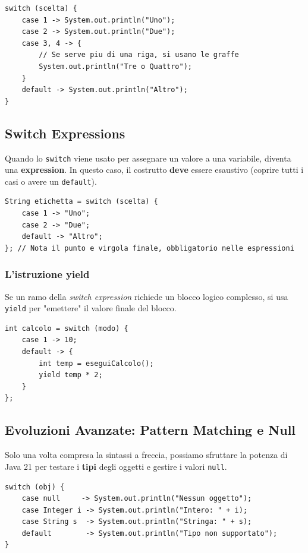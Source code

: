 \begin{lstlisting}[caption={Switch moderno con freccia}]
switch (scelta) {
    case 1 -> System.out.println("Uno");
    case 2 -> System.out.println("Due");
    case 3, 4 -> {
        // Se serve piu di una riga, si usano le graffe
        System.out.println("Tre o Quattro");
    }
    default -> System.out.println("Altro");
}
\end{lstlisting}



\subsection{Switch Expressions}
Quando lo \texttt{switch} viene usato per assegnare un valore a una variabile, diventa una \textbf{expression}. In questo caso, il costrutto \textbf{deve} essere esaustivo (coprire tutti i casi o avere un \texttt{default}).

\begin{lstlisting}[caption={Switch come espressione}]
String etichetta = switch (scelta) {
    case 1 -> "Uno";
    case 2 -> "Due";
    default -> "Altro";
}; // Nota il punto e virgola finale, obbligatorio nelle espressioni
\end{lstlisting}

\subsubsection{L'istruzione yield}
Se un ramo della \textit{switch expression} richiede un blocco logico complesso, si usa \texttt{yield} per "emettere" il valore finale del blocco.

\begin{lstlisting}[caption={Uso di yield}]
int calcolo = switch (modo) {
    case 1 -> 10;
    default -> {
        int temp = eseguiCalcolo();
        yield temp * 2;
    }
};
\end{lstlisting}

\subsection{Evoluzioni Avanzate: Pattern Matching e Null}
Solo una volta compresa la sintassi a freccia, possiamo sfruttare la potenza di Java 21 per testare i \textbf{tipi} degli oggetti e gestire i valori \texttt{null}.

\begin{lstlisting}[caption={Pattern Matching e gestione null}]
switch (obj) {
    case null     -> System.out.println("Nessun oggetto");
    case Integer i -> System.out.println("Intero: " + i);
    case String s  -> System.out.println("Stringa: " + s);
    default        -> System.out.println("Tipo non supportato");
}
\end{lstlisting}

